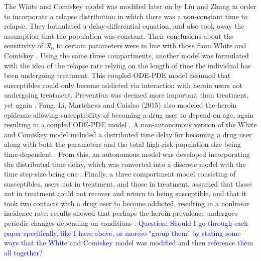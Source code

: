 \documentclass[12pt]{article}
\begin{document}
The White and Comiskey model was modified later on by Liu and Zhang in order to incorporate a relapse distribution in which there was a non-constant time to relapse. They formulated a delay-differential equation, and also took away the assumption that the population was constant. Their conclusions about the sensitivity of $\mathscr{R}_0$ to certain parameters were in line with those from White and Comiskey \cite{Liu}. Using the same three compartments, another model was formulated with the idea of the relapse rate relying on the length of time the individual has been undergoing treatment. This coupled ODE-PDE model assumed that susceptibles could only become addicted via interaction with heroin users not undergoing treatment. Prevention was deemed more important than treatment, yet again \cite{Fang1}. Fang, Li, Martcheva and Caialso (2015) also modeled the heroin epidemic allowing susceptibility of becoming a drug user to depend on age, again resulting in a coupled ODE-PDE model \cite{Fang2}. A non-autonomous version of the White and Comiskey model included a distributed time delay for becoming a drug user along with both the parameters and the total high-risk population size being time-dependent \cite{Samanta}. From this, an autonomous model was developed incorporating the distributed time delay, which was converted into a discrete model with the time step-size being one \cite{Abdurahman}. Finally, a three compartment model consisting of susceptibles, users not in treatment, and those in treatment, assumed that those not in treatment could not recover and return to being susceptible, and that it took two contacts with a drug user to become addicted, resulting in a nonlinear incidence rate; results showed that perhaps the heroin prevalence undergoes periodic changes depending on conditions \cite{Ma}. \textcolor{blue}{Question: Should I go through each paper specifically, like I have above, or moreso "group them" by stating some ways that the White and Comiskey model was modified and then reference them all together?}
\end{document}
